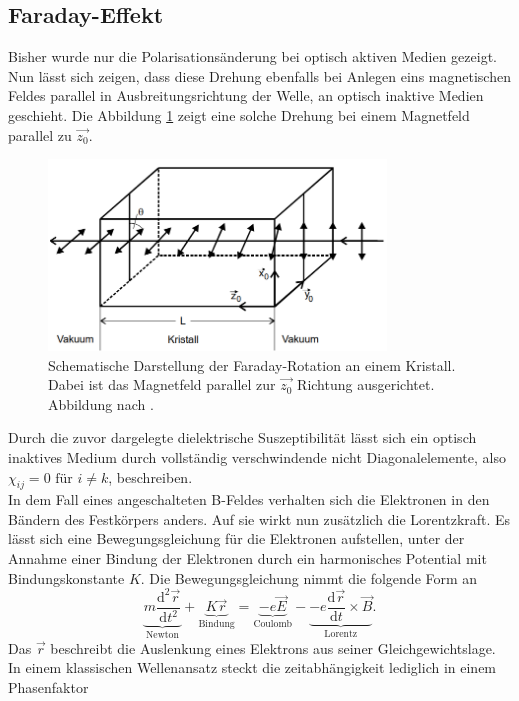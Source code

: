 \subsection{Faraday-Effekt}
Bisher wurde nur die Polarisationsänderung bei optisch aktiven Medien gezeigt. Nun lässt sich zeigen, dass diese Drehung ebenfalls bei Anlegen eins magnetischen Feldes parallel in Ausbreitungsrichtung der Welle,
an optisch inaktive Medien geschieht. 
Die Abbildung \ref{fig:drehungitin} zeigt eine solche Drehung bei einem Magnetfeld parallel zu $\vec{z_0}$.
\begin{figure}
    \centering
    \includegraphics[width=0.8\textwidth]{bilder/drehung.png}    
    \caption{Schematische Darstellung der Faraday-Rotation an einem Kristall. Dabei ist das Magnetfeld parallel zur $\vec{z_0}$ Richtung ausgerichtet. 
    Abbildung nach \cite{skriptanhang}.}
    \label{fig:drehungitin}
\end{figure}
Durch die zuvor dargelegte dielektrische Suszeptibilität lässt sich ein optisch inaktives Medium durch vollständig verschwindende
nicht Diagonalelemente, also $\chi_{ij} = 0 \text{ für }i \neq k$, beschreiben.
\\
In dem Fall eines angeschalteten B-Feldes verhalten sich die Elektronen in den Bändern des Festkörpers anders. Auf sie wirkt nun zusätzlich die Lorentzkraft.
Es lässt sich eine Bewegungsgleichung für die Elektronen aufstellen, unter der Annahme einer Bindung der Elektronen durch ein harmonisches Potential mit Bindungskonstante
$K$. Die Bewegungsgleichung nimmt die folgende Form an 
\begin{equation*}
\underbrace{m \frac{\text{d}^2\vec{r}}{\text{d}t^2}}_{\text{Newton}} + \underbrace{K\vec{r}}_{\text{Bindung}} = \underbrace{-e \vec{E}}_{\text{Coulomb}} - \underbrace{-e \frac{\text{d}\vec{r}}{\text{d}t} \times \vec{B}}_{\text{Lorentz}}.
\end{equation*}
Das $\vec{r}$ beschreibt die Auslenkung eines Elektrons aus seiner Gleichgewichtslage. In einem klassischen Wellenansatz steckt die zeitabhängigkeit lediglich in einem Phasenfaktor
